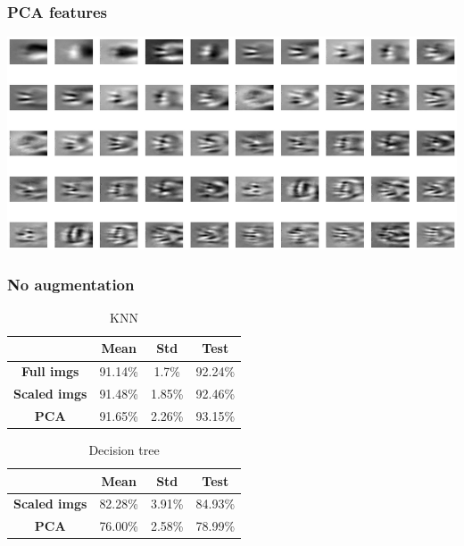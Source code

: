 \documentclass[aspectratio=169]{beamer}
\begin{document}
\begin{frame}
  \frametitle{PCA features}
\centering
\includegraphics[scale=0.35]{images/simplepca.png}
\end{frame}








\begin{frame}
  \frametitle{No augmentation}

  \begin{table}
    \centering
    \captionsetup{labelformat=empty}
    \caption{KNN}
    \begin{tabular}{|c|c|c|c|}
    \hline
       & Mean & Std & Test \\
      \hline
      \textbf{Full imgs} & 91.14\% & 1.7\%  & 92.24\% \\
      \hline
      \textbf{Scaled imgs} & 91.48\% & 1.85\% & 92.46\% \\
      \hline
      \textbf{PCA} & 91.65\% & 2.26\% & 93.15\% \\
      \hline
    \end{tabular}
  \end{table}

  \begin{table}
    \centering
    \captionsetup{labelformat=empty}
    \caption{Decision tree}
    \begin{tabular}{|c|c|c|c|}
    \hline
       & Mean & Std & Test \\
      \hline
      \textbf{Scaled imgs} & 82.28\% & 3.91\% & 84.93\% \\
      \hline
      \textbf{PCA} & 76.00\% & 2.58\% & 78.99\% \\
      \hline
    \end{tabular}
  \end{table}

\end{frame}
\end{document}
